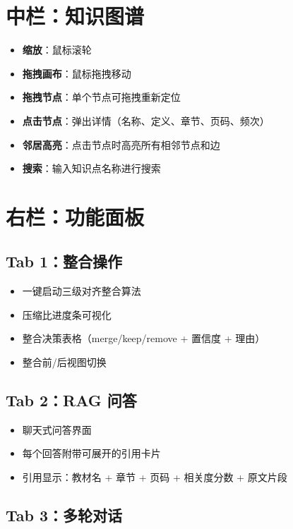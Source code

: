 \documentclass[12pt,a4paper]{article}
\begin{document}
\section{中栏：知识图谱}

\begin{itemize}[leftmargin=2em]
    \item \textbf{缩放}：鼠标滚轮
    \item \textbf{拖拽画布}：鼠标拖拽移动
    \item \textbf{拖拽节点}：单个节点可拖拽重新定位
    \item \textbf{点击节点}：弹出详情（名称、定义、章节、页码、频次）
    \item \textbf{邻居高亮}：点击节点时高亮所有相邻节点和边
    \item \textbf{搜索}：输入知识点名称进行搜索
\end{itemize}

\section{右栏：功能面板}

\subsection{Tab 1：整合操作}

\begin{itemize}[leftmargin=2em]
    \item 一键启动三级对齐整合算法
    \item 压缩比进度条可视化
    \item 整合决策表格（merge/keep/remove + 置信度 + 理由）
    \item 整合前/后视图切换
\end{itemize}

\subsection{Tab 2：RAG 问答}

\begin{itemize}[leftmargin=2em]
    \item 聊天式问答界面
    \item 每个回答附带可展开的引用卡片
    \item 引用显示：教材名 + 章节 + 页码 + 相关度分数 + 原文片段
\end{itemize}

\subsection{Tab 3：多轮对话}
\end{document}
